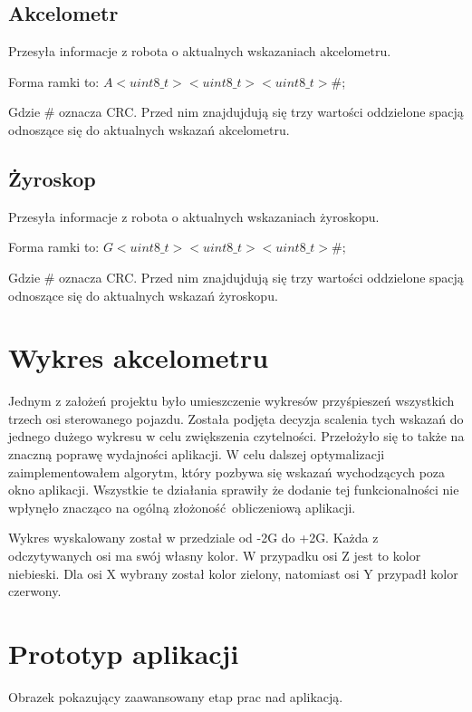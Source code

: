 \documentclass[12pt,a4paper,polish]{article}
\begin{document}
  \subsection{Akcelometr}
  Przesyła informacje z robota o aktualnych wskazaniach akcelometru.

  Forma ramki to: $A<uint8\_t> <uint8\_t> <uint8\_t>\#$;
  \newline

  Gdzie \# oznacza CRC. Przed nim znajdujdują się trzy wartości oddzielone spacją
  odnoszące się do aktualnych wskazań akcelometru.


  \subsection{Żyroskop}
  Przesyła informacje z robota o aktualnych wskazaniach żyroskopu.

  Forma ramki to: $G<uint8\_t> <uint8\_t> <uint8\_t>\#$;
  \newline

  Gdzie \# oznacza CRC. Przed nim znajdujdują się trzy wartości oddzielone spacją
  odnoszące się do aktualnych wskazań żyroskopu.

  \section{Wykres akcelometru}
  Jednym z założeń projektu było umieszczenie wykresów przyśpieszeń wszystkich
  trzech osi sterowanego pojazdu. Została podjęta decyzja scalenia tych wskazań
  do jednego dużego wykresu w celu zwiększenia czytelności. Przełożyło się to także
  na znaczną poprawę wydajności aplikacji. W celu dalszej optymalizacji 
  zaimplementowałem algorytm, który pozbywa się wskazań wychodzących poza okno 
  aplikacji. Wszystkie te działania sprawiły że dodanie tej funkcionalności
  nie wpłynęło znacząco na ogólną złożoność obliczeniową aplikacji.
  
  Wykres wyskalowany został w przedziale od -2G do +2G. Każda z odczytywanych osi
  ma swój własny kolor. W przypadku osi Z jest to kolor niebieski. 
  Dla osi X wybrany został kolor zielony, natomiast osi Y przypadł kolor czerwony.

  \section{Prototyp aplikacji}
  Obrazek pokazujący zaawansowany etap prac nad aplikacją.
\end{document}
